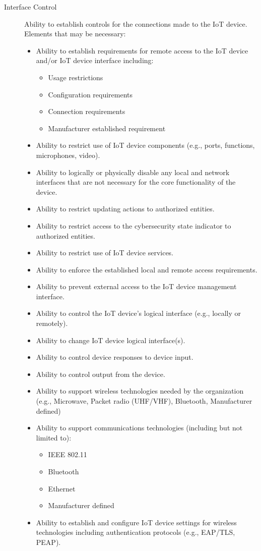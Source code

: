 \begin{description}
    \item[Interface Control] Ability to establish controls for the connections made to the IoT device. Elements that may be necessary:
    \begin{itemize}
        \item Ability to establish requirements for remote access to the IoT device and/or IoT device interface including:
        \begin{itemize}
            \item Usage restrictions
            \item Configuration requirements
            \item Connection requirements
            \item Manufacturer established requirement
        \end{itemize}
        \item Ability to restrict use of IoT device components (e.g., ports, functions, microphones, video).
        \item Ability to logically or physically disable any local and network interfaces that are not necessary for the core functionality of the device.
        \item Ability to restrict updating actions to authorized entities.
        \item Ability to restrict access to the cybersecurity state indicator to authorized entities.
        \item Ability to restrict use of IoT device services.
        \item Ability to enforce the established local and remote access requirements.
        \item Ability to prevent external access to the IoT device management interface.
        \item Ability to control the IoT device’s logical interface (e.g., locally or remotely).
        \item Ability to change IoT device logical interface(s).
        \item Ability to control device responses to device input.
        \item Ability to control output from the device.
        \item Ability to support wireless technologies needed by the organization (e.g., Microwave, Packet radio (UHF/VHF), Bluetooth, Manufacturer defined)
        \item Ability to support communications technologies (including but not limited to):
        \begin{itemize}
            \item IEEE 802.11
            \item Bluetooth
            \item Ethernet
            \item Manufacturer defined
        \end{itemize}
        \item Ability to establish and configure IoT device settings for wireless technologies including authentication protocols (e.g., EAP/TLS, PEAP).
    \end{itemize}
\end{description}
    
